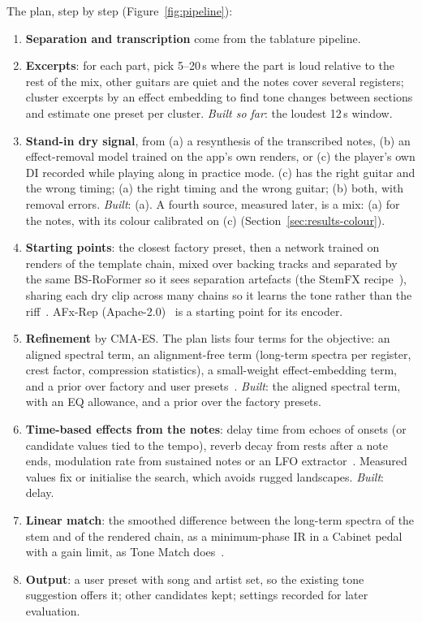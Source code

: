 The plan, step by step (Figure~\ref{fig:pipeline}):
\begin{enumerate}
\item \textbf{Separation and transcription} come from the tablature pipeline.
\item \textbf{Excerpts}: for each part, pick 5--20\,s where the part is loud
  relative to the rest of the mix, other guitars are quiet and the notes cover
  several registers; cluster excerpts by an effect embedding to find tone changes
  between sections and estimate one preset per cluster. \emph{Built so far}: the
  loudest 12\,s window.
\item \textbf{Stand-in dry signal}, from (a) a resynthesis of the transcribed
  notes, (b) an effect-removal model trained on the app's own renders, or (c) the
  player's own DI recorded while playing along in practice mode. (c) has the right
  guitar and the wrong timing; (a) the right timing and the wrong guitar; (b)
  both, with removal errors. \emph{Built}: (a). A fourth source, measured
  later, is a mix: (a) for the notes, with its colour calibrated on (c)
  (Section~\ref{sec:results-colour}).
\item \textbf{Starting points}: the closest factory preset, then a network
  trained on renders of the template chain, mixed over backing tracks and
  separated by the same BS-RoFormer so it sees separation artefacts (the StemFX
  recipe~\cite{cheng2026stemfx}), sharing each dry clip across many chains so it
  learns the tone rather than the riff~\cite{nathanben2026tonerunner}. AFx-Rep
  (Apache-2.0)~\cite{steinmetz2024stito} is a starting point for its encoder.
\item \textbf{Refinement} by CMA-ES. The plan lists four terms for the
  objective: an aligned spectral term, an alignment-free term (long-term spectra
  per register, crest factor, compression statistics), a small-weight
  effect-embedding term, and a prior over factory and user
  presets~\cite{yu2025improving}. \emph{Built}: the aligned spectral term, with an
  EQ allowance, and a prior over the factory presets.
\item \textbf{Time-based effects from the notes}: delay time from echoes of
  onsets (or candidate values tied to the tempo), reverb decay from rests after a
  note ends, modulation rate from sustained notes or an LFO
  extractor~\cite{mitcheltree2023modulation}. Measured values fix or initialise
  the search, which avoids rugged landscapes. \emph{Built}: delay.
\item \textbf{Linear match}: the smoothed difference between the long-term
  spectra of the stem and of the rendered chain, as a minimum-phase IR in a
  Cabinet pedal with a gain limit, as Tone Match does~\cite{fractalndtonematch}.
\item \textbf{Output}: a user preset with song and artist set, so the existing
  tone suggestion offers it; other candidates kept; settings recorded for later
  evaluation.
\end{enumerate}
